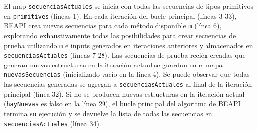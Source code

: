 El map \texttt{secuenciasActuales} se inicia con todas las secuencias de tipos primitivos en \texttt{primitives} (líneas 1). 
En cada iteración del bucle principal (líneas 3-33), \textsf{BEAPI}  crea nuevas secuencias para cada método disponible \texttt{m} (línea 6), 
explorando exhaustivamente todas las posibilidades para crear secuencias de prueba utilizando \texttt{m} e inputs generados en iteraciones anteriores y almacenados en \texttt{secuenciasActuales} (líneas 7-28).
Las secuencias de prueba recién creadas que generan nuevas estructuras en la iteración actual se guardan en el mapa \texttt{nuevasSecuencias} (inicializado vacío en la línea 4). 
Se puede observar que todas las secuencias generadas se agregan a \texttt{secuenciasActuales} al final de la iteración principal (línea 32).
Si no se producen nuevas estructuras en la iteración actual (\texttt{hayNuevas} es falso en la línea 29), el bucle principal del algoritmo de \textsf{BEAPI} termina su ejecución 
y se devuelve la lista de todas las secuencias en \texttt{secuenciasActuales} (línea 34).


